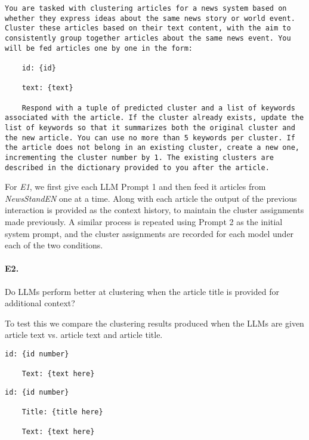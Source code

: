 \begin{lstlisting}[title=Prompt 2: Detailed Initial System Prompt]
    You are tasked with clustering articles for a news system based on whether they express ideas about the same news story or world event. Cluster these articles based on their text content, with the aim to consistently group together articles about the same news event. You will be fed articles one by one in the form:

    id: {id}
    
    text: {text}
    
    Respond with a tuple of predicted cluster and a list of keywords associated with the article. If the cluster already exists, update the list of keywords so that it summarizes both the original cluster and the new article. You can use no more than 5 keywords per cluster. If the article does not belong in an existing cluster, create a new one, incrementing the cluster number by 1. The existing clusters are described in the dictionary provided to you after the article.
\end{lstlisting}

For \emph{E1}, we first give each LLM Prompt 1 and then feed it articles from \emph{NewsStandEN} one at a time. Along with each article the output of the previous interaction is provided as the context history, to maintain the cluster assignments made previously.
A similar process is repeated using Prompt 2 as the initial system prompt, and the cluster assignments are recorded for each model under each of the two conditions.

\paragraph{\textbf{E2.}}
Do LLMs perform better at clustering when the article title is provided for additional context? 

\noindent To test this we compare the clustering results produced when the LLMs are given article text vs. article text and article title. 

\begin{lstlisting}[title=Prompt 3: Text Alone Prompt]
    id: {id number}
    
    Text: {text here}
    \end{lstlisting}
    \begin{lstlisting}[title=Prompt 4: Title and Text Prompt]
    id: {id number}
    
    Title: {title here}

    Text: {text here}
\end{lstlisting}

